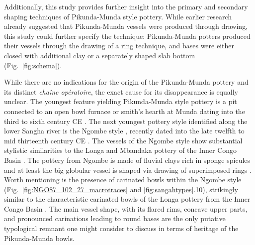 \documentclass[smallextended,natbib]{svjour3}       %
\begin{document}
Additionally, this study provides further insight into the primary and secondary shaping techniques of Pikunda-Munda style pottery. While earlier research \citep[47--51 Fig.~13,69--73]{Seidensticker.2021e} already suggested that Pikunda-Munda vessels were produced through drawing, this study could further specify the technique: Pikunda-Munda potters produced their vessels through the drawing of a ring technique, and bases were either closed with additional clay or a separately shaped slab bottom (Fig.~\ref{fig:schema}).


While there are no indications for the origin of the Pikunda-Munda pottery and its distinct \textit{chaîne opératoire}, the exact cause for its disappearance is equally unclear. The youngest feature yielding Pikunda-Munda style pottery is a pit connected to an open bowl furnace or smith's hearth at Munda dating into the third to sixth century CE \citep[335--339 Fig.~170]{Seidensticker.2021e}. The next youngest pottery style identified along the lower Sangha river is the Ngombe style \citep[Fig.~\ref{fig:timeslicemaps};][125--128]{Seidensticker.2021e}, recently dated into the late twelfth to mid thirteenth century CE \citep[Tab.~2: RICH-30864]{Seidensticker.2024}. The vessels of the Ngombe style show substantial stylistic similarities to the Longa and Mbandaka pottery of the Inner Congo Basin \citep[121--128,139--143]{Wotzka.1995}. The pottery from Ngombe is made of fluvial clays rich in sponge spicules \citep{Seidensticker.2020} and at least the big globular vessel is shaped via drawing of superimposed rings \citep[Figs.~\ref{fig:NGO87_102_27_macrotraces} and \ref{fig:NGO87_102_28-29_macrotraces};][52--53 Fig.~15]{Seidensticker.2021e}. Worth mentioning is the presence of carinated bowls within the Ngombe style (Fig.~\ref{fig:NGO87_102_27_macrotraces} and \ref{fig:sangahtypes}.10), strikingly similar to the characteristic carinated bowls of the Longa pottery from the Inner Congo Basin \citep[121--128]{Wotzka.1995}. The main vessel shape, with its flared rims, concave upper parts, and pronounced carinations leading to round bases \citep[197 Fig.~94.1--2]{Seidensticker.2021e} are the only putative typological remnant one might consider to discuss in terms of heritage of the Pikunda-Munda bowls.
\end{document}

